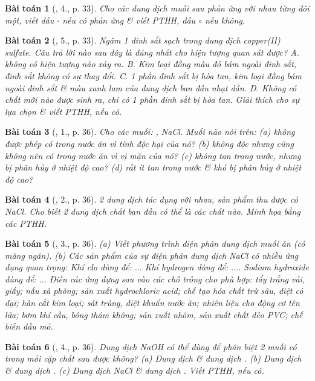 \documentclass{article}
\newtheorem{baitoan}{Bài toán}
\begin{document}
\begin{baitoan}[\cite{SGK_Hoa_Hoc_9}, 4., p. 33]
	Cho các dung dịch muối sau phản ứng với nhau từng đôi một, viết dấu $\cdot$ nếu có phản ứng \& viết PTHH, dấu $\circ$ nếu không.
\end{baitoan}

\begin{baitoan}[\cite{SGK_Hoa_Hoc_9}, 5., p. 33]
	Ngâm 1 đinh sắt sạch trong dung dịch copper(II) sulfate. Câu trả lời nào sau đây là đúng nhất cho hiện tượng quan sát được? {\sf A.} không có hiện tượng nào xảy ra. {\sf B.} Kim loại đồng màu đỏ bám ngoài đinh sắt, đinh sắt không có sự thay đổi. {\sf C.} 1 phần đinh sắt bị hòa tan, kim loại đồng bám ngoài đinh sắt \& màu xanh lam của dung dịch ban đầu nhạt dần. {\sf D.} Không có chất mới nào được sinh ra, chỉ có 1 phần đinh sắt bị hòa tan. Giải thích cho sự lựa chọn \& viết PTHH, nếu có.
\end{baitoan}

\begin{baitoan}[\cite{SGK_Hoa_Hoc_9}, 1., p. 36]
	Cho các muối: {\rm{}, NaCl}. Muối nào nói trên: (a) không được phép có trong nước ăn vì tính độc hại của nó? (b) không độc nhưng cũng không nên có trong nước ăn vì vị mặn của nó? (c) không tan trong nước, nhưng bị phân hủy ở nhiệt độ cao? (d) rất ít tan trong nước \& khó bị phân hủy ở nhiệt độ cao?
\end{baitoan}

\begin{baitoan}[\cite{SGK_Hoa_Hoc_9}, 2., p. 36]
	2 dung dịch tác dụng với nhau, sản phẩm thu được có {\rm NaCl}. Cho biết 2 dung dịch chất ban đầu có thể là các chất nào. Minh họa bằng các PTHH.
\end{baitoan}

\begin{baitoan}[\cite{SGK_Hoa_Hoc_9}, 3., p. 36]
	(a) Viết phương trình điện phân dung dịch muối ăn (có màng ngăn). (b) Các sản phẩm của sự điện phân dung dịch {\rm NaCl} có nhiều ứng dụng quan trọng: Khí clo dùng để: $\ldots$ Khí hydrogen dùng để: $\ldots$. Sodium hydroxide dùng để: $\ldots$ Điền các ứng dựng sau vào các chỗ trống cho phù hợp: tẩy trắng vải, giấy; nấu xà phòng; sản xuất hydrochloric acid; chế tạo hóa chất trừ sâu, diệt cỏ dại; hàn cắt kim loại; sát trùng, diệt khuẩn nước ăn; nhiên liệu cho động cơ tên lửa; bơm khí cầu, bóng thám không; sản xuất nhôm, sản xuất chất dẻo PVC; chế biến dầu mỏ.
\end{baitoan}

\begin{baitoan}[\cite{SGK_Hoa_Hoc_9}, 4., p. 36]
	Dung dịch {\rm NaOH} có thể dùng để phân biệt 2 muối có trong mỗi cặp chất sau được không? (a) Dung dịch {\rm{}} \& dung dịch {\rm{}}. (b) Dung dịch {\rm{}} \& dung dịch {\rm{}}. (c) Dung dịch {\rm NaCl} \& dung dịch {\rm{}}. Viết {\rm PTHH}, nếu có.
\end{baitoan}
\end{document}
